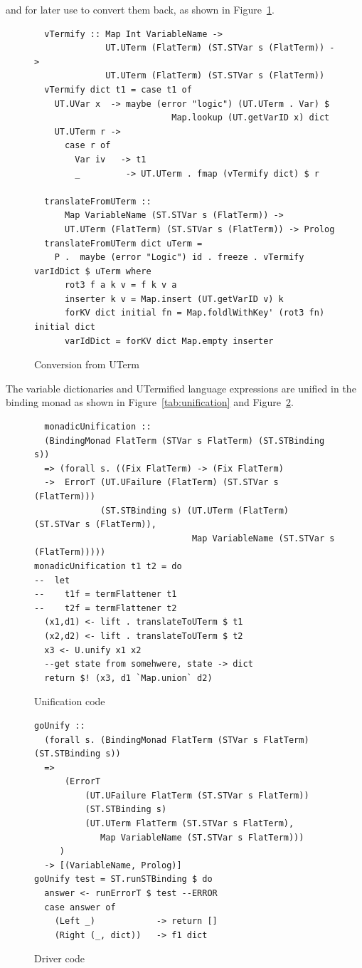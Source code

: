 \documentclass[thesis-solanki.tex]{subfiles}
\begin{document}
%
and for later use to convert them back, as shown in Figure~\ref{tab:from-UTerm}.
%
\begin{figure}
  \begin{verbatim}
  vTermify :: Map Int VariableName ->
              UT.UTerm (FlatTerm) (ST.STVar s (FlatTerm)) ->
              UT.UTerm (FlatTerm) (ST.STVar s (FlatTerm))
  vTermify dict t1 = case t1 of
    UT.UVar x  -> maybe (error "logic") (UT.UTerm . Var) $
                           Map.lookup (UT.getVarID x) dict
    UT.UTerm r ->
      case r of
        Var iv   -> t1
        _         -> UT.UTerm . fmap (vTermify dict) $ r

  translateFromUTerm ::
      Map VariableName (ST.STVar s (FlatTerm)) ->
      UT.UTerm (FlatTerm) (ST.STVar s (FlatTerm)) -> Prolog
  translateFromUTerm dict uTerm =
    P .  maybe (error "Logic") id . freeze . vTermify varIdDict $ uTerm where
      rot3 f a k v = f k v a
      inserter k v = Map.insert (UT.getVarID v) k
      forKV dict initial fn = Map.foldlWithKey' (rot3 fn) initial dict
      varIdDict = forKV dict Map.empty inserter
  \end{verbatim}
  \caption{Conversion from UTerm}
  \label{tab:from-UTerm}
\end{figure}

\clearpage
The variable dictionaries and UTermified language expressions are unified in the binding monad as shown in Figure~\ref{tab:unification} and Figure~\ref{tab:unif-driver}.
%
\begin{figure}
\begin{verbatim}
  monadicUnification ::
  (BindingMonad FlatTerm (STVar s FlatTerm) (ST.STBinding s))
  => (forall s. ((Fix FlatTerm) -> (Fix FlatTerm)
  ->  ErrorT (UT.UFailure (FlatTerm) (ST.STVar s (FlatTerm)))
             (ST.STBinding s) (UT.UTerm (FlatTerm) (ST.STVar s (FlatTerm)),
                               Map VariableName (ST.STVar s (FlatTerm)))))
monadicUnification t1 t2 = do
--  let
--    t1f = termFlattener t1
--    t2f = termFlattener t2
  (x1,d1) <- lift . translateToUTerm $ t1
  (x2,d2) <- lift . translateToUTerm $ t2
  x3 <- U.unify x1 x2
  --get state from somehwere, state -> dict
  return $! (x3, d1 `Map.union` d2)
\end{verbatim}
  \vspace*{-1.0\baselineskip}
  \caption{Unification code}
  \label{tab:unification}

\begin{verbatim}
goUnify ::
  (forall s. (BindingMonad FlatTerm (STVar s FlatTerm) (ST.STBinding s))
  =>
      (ErrorT
          (UT.UFailure FlatTerm (ST.STVar s FlatTerm))
          (ST.STBinding s)
          (UT.UTerm FlatTerm (ST.STVar s FlatTerm),
             Map VariableName (ST.STVar s FlatTerm)))
     )
  -> [(VariableName, Prolog)]
goUnify test = ST.runSTBinding $ do
  answer <- runErrorT $ test --ERROR
  case answer of
    (Left _)            -> return []
    (Right (_, dict))   -> f1 dict
\end{verbatim}
  \vspace*{-1.0\baselineskip}
  \caption{Driver code}
  \label{tab:unif-driver}
\end{figure}
\end{document}
